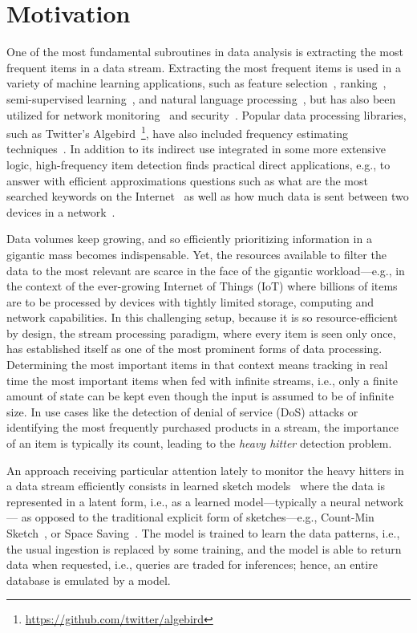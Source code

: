 
\section{Motivation}

One of the most fundamental subroutines in data analysis is extracting the most frequent items in a data stream. Extracting the most frequent items is used in a variety of machine learning applications, such as feature selection~\cite{thoma2009near}, ranking~\cite{popescu2011text}, semi-supervised learning~\cite{ahmed2015semi}, and natural language processing~\cite{chowdhury2003natural}, but has also been utilized for network monitoring~\cite{li2010mining} and security~\cite{paredes2010automating}. Popular data processing libraries, such as Twitter's Algebird~\footnote{\url{https://github.com/twitter/algebird}}, have also included frequency estimating techniques~\cite{deng2007new}. In addition to its indirect use integrated in some more extensive logic, high-frequency item detection finds practical direct applications, e.g., to answer with efficient approximations  questions such as what are the most searched keywords on the Internet~\cite{rovetta2020covid} as well as how much data is sent between two devices in a network~\cite{mistry2016network}.

Data volumes keep growing, and so efficiently prioritizing information in a gigantic mass becomes indispensable. Yet, the resources available to filter the data to the most relevant are scarce in the face of the gigantic workload---e.g., in the context of the ever-growing Internet of Things (IoT) where billions of items are to be processed by devices with tightly limited storage, computing and network capabilities.
% 
In this challenging setup, because it is so resource-efficient by design, the stream processing paradigm, where every item is seen only once, has established itself as one of the most prominent forms of data processing. Determining the most important items in that context means tracking in real time the most important items when fed with infinite streams, i.e., only a finite amount of state can be kept even though the input is assumed to be of infinite size.
% 
In use cases like the detection of denial of service (DoS) attacks or identifying the most frequently purchased products in a stream, the importance of an item is typically its count, leading to the \emph{heavy hitter} detection problem.

An approach receiving particular attention lately to monitor the heavy hitters in a data stream efficiently consists in learned sketch models~\cite{hsu2019learning,kristo2020case,patil2021latest} where the data is represented in a latent form, i.e., as a learned model---typically a neural network--- as opposed to the traditional explicit form of sketches---e.g., Count-Min Sketch~\cite{cormode2005improved}, or Space Saving~\cite{mitzenmacher2012hierarchical}. The model is trained to learn the data patterns, i.e., the usual ingestion is replaced by some training, and the model is able to return data when requested, i.e., queries are traded for inferences; hence, an entire database is emulated by a model.

